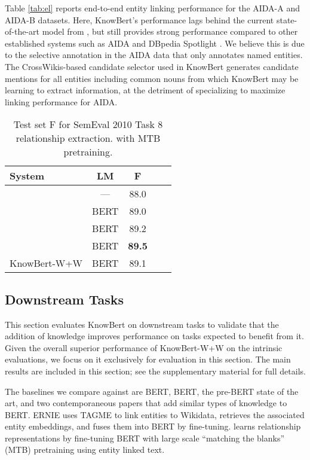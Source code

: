 \documentclass[11pt,a4paper]{article}
\newcommand{\KB}[0]{KnowBert}
\newcommand{\KBS}[0]{KnowBert }
\newcommand{\KWANDW}[0]{KnowBert-W+W}
\newcommand{\KWANDWS}[0]{KnowBert-W+W }
\newcommand{\BBS}[0]{BERT }
\newcommand{\BB}[0]{BERT}
\newcommand{\BLS}[0]{BERT }
\newcommand{\BL}[0]{BERT}
\begin{document}
Table \ref{tab:el} reports end-to-end entity linking performance for the AIDA-A and AIDA-B datasets.  Here, \KB's performance lags behind the current state-of-the-art model from \citet{Kolitsas2018EndtoEndNE}, but still provides strong performance compared to other established systems such as AIDA \cite{Hoffart2011RobustDO} and DBpedia Spotlight \cite{Daiber2013ImprovingEA}.
We believe this is due to the selective annotation in the AIDA data that only annotates named entities.  The CrossWikis-based candidate selector used in \KBS generates candidate mentions for all entities including common nouns from which \KBS may be learning to extract information, at the detriment of specializing to maximize linking performance for AIDA.


\begin{table}
\centering
\begin{tabular}{l c c c c}
\toprule
System & LM & F \\
 \midrule
 \citet{wang-etal-2016-relation} & --- & 88.0 \\
 \citet{wang-etal-2019-extracting} & \BBS & 89.0 \\
 \citet{Soares2019MatchingTB} &\BLS & 89.2 \\ 
 \citet{Soares2019MatchingTB} & \BL & \textbf{89.5} \\
 \KWANDW & \BBS &  89.1 \\
\bottomrule
\end{tabular}
\caption{Test set F for SemEval 2010 Task 8 relationship extraction.
 with MTB pretraining. 
}
\label{tab:semeval2010}
\end{table}






\subsection{Downstream Tasks}

\label{sec:downstream}

This section evaluates \KBS on downstream tasks to validate that the addition of knowledge improves performance on tasks expected to benefit from it.
Given the overall superior performance of \KWANDWS on the intrinsic evaluations, we focus on it exclusively for evaluation in this section.  The main results are included in this section; see the supplementary material for full details.

The baselines we compare against are \BB, \BL, the pre-BERT state of the art, and two contemporaneous papers that add similar types of knowledge to BERT.  ERNIE \cite{Zhang2019ERNIEEL} uses TAGME \cite{Ferragina2010TAGMEOA} to link entities to Wikidata, retrieves the associated entity embeddings, and fuses them into \BBS by fine-tuning.
\citet{Soares2019MatchingTB} learns relationship representations by fine-tuning \BLS with large scale ``matching the blanks'' (MTB) pretraining using entity linked text.
\end{document}
